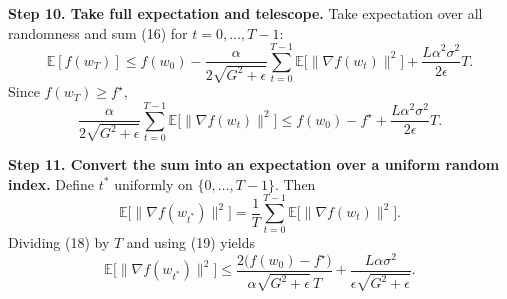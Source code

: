 \documentclass{article}
\newcommand{\E}{\mathbb{E}}
\begin{document}
\noindent\textbf{Step 10. Take full expectation and telescope.}  
Take expectation over all randomness and sum (16) for $t=0,\dots,T-1$:
\[
\E[f(w_T)] \le f(w_0)
- \frac{\alpha}{2\sqrt{G^{2}+\epsilon}}\sum_{t=0}^{T-1}\E\!\big[\|\nabla f(w_t)\|^{2}\big]
+ \frac{L\alpha^{2}\sigma^{2}}{2\epsilon}T.
\tag{17}
\]
Since $f(w_T)\ge f^{\star}$,
\[
\frac{\alpha}{2\sqrt{G^{2}+\epsilon}}\sum_{t=0}^{T-1}\E\!\big[\|\nabla f(w_t)\|^{2}\big]
\le f(w_0)-f^{\star}
+ \frac{L\alpha^{2}\sigma^{2}}{2\epsilon}T .
\tag{18}
\]

\noindent\textbf{Step 11. Convert the sum into an expectation over a uniform random index.}  
Define $t^{*}$ uniformly on $\{0,\dots,T-1\}$. Then
\[
\E\!\big[\|\nabla f(w_{t^{*}})\|^{2}\big]
= \frac{1}{T}\sum_{t=0}^{T-1}\E\!\big[\|\nabla f(w_t)\|^{2}\big].
\tag{19}
\]
Dividing (18) by $T$ and using (19) yields
\[
\E\!\big[\|\nabla f(w_{t^{*}})\|^{2}\big]
\le
\frac{2\big(f(w_0)-f^{\star}\big)}{\alpha\sqrt{G^{2}+\epsilon}\,T}
+ \frac{L\alpha\sigma^{2}}{\epsilon\sqrt{G^{2}+\epsilon}} .
\tag{20}
\]
\end{document}
